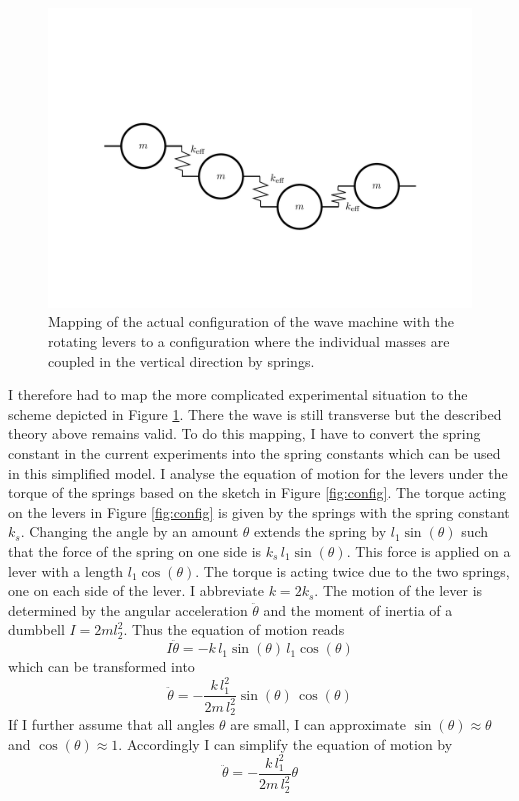 \documentclass[12pt]{article}
\begin{document}
\begin{figure}[hbt]
  \includegraphics[width =.5\textwidth]{equivalance.pdf}
  \caption{Mapping of the actual configuration of the wave machine with the rotating levers to a configuration where the individual masses are coupled in the vertical direction by springs.}\label{fig:equivalence}
\end{figure}
I therefore had to map the more complicated experimental situation to the  scheme depicted in Figure \ref{fig:equivalence}. There the wave is still transverse but the described theory above remains valid. To do this mapping, I have to convert the spring constant in the current experiments into the spring constants which can be used in this simplified model. I analyse the equation of motion for the levers under the torque of the springs based on the sketch in Figure \ref{fig:config}. The torque acting on the levers in Figure \ref{fig:config} is given by the springs with the spring constant $k_s$. Changing the angle by an amount $\theta$ extends the spring by $l_{1}\sin(\theta)$ such that the force of the spring on one side is $k_s\, l_{1}\sin(\theta)$. This force is applied on a lever with a length $l_{1}\cos(\theta)$. The torque is acting twice due to the two springs, one on each side of the lever. I abbreviate $k=2k_{s}$. The motion of the lever is determined by the angular acceleration $\ddot{\theta}$ and the moment of inertia of a dumbbell $I=2 m l_{2}^2$. Thus the equation of motion reads
\begin{equation}\label{eq:eqofmotion}
    I\ddot{\theta}=-k\, l_{1}\sin(\theta)\, l_{1}\cos(\theta)
\end{equation}
which can be transformed into 
\begin{equation}
    \ddot{\theta}=-\frac{k\, l_{1}^2}{2m\,l_{2}^2}\sin(\theta)\,\cos(\theta)
\end{equation}
If I further assume that all angles $\theta$ are small, I can approximate $\sin(\theta)\approx \theta$ and $\cos(\theta)\approx 1$. Accordingly I can simplify the equation of motion by
\begin{equation}
    \ddot{\theta}=-\frac{k\, l_{1}^2}{2m\,l_{2}^2}\theta
\end{equation}
\end{document}

